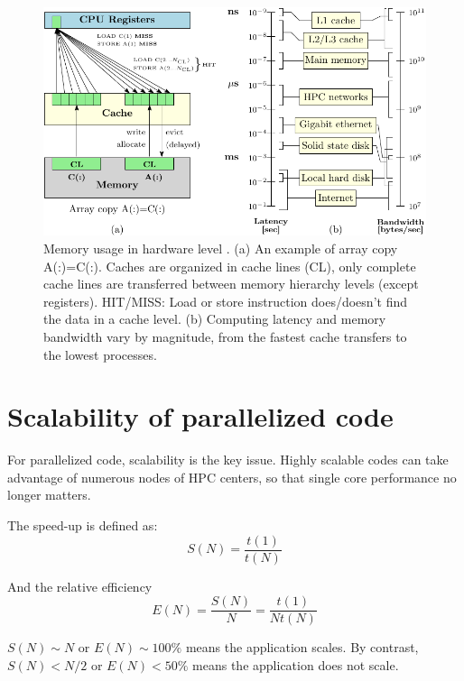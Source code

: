 \begin{figure}[h]
\begin{centering}
\includegraphics{_figure/memory}
\par\end{centering}
\caption[Memory usage in hardware level]{Memory usage in hardware level \citep{LRZ-cours}. (a) An example
of array copy A(:)=C(:). Caches are organized in cache lines (CL),
only complete cache lines are transferred between memory hierarchy
levels (except registers). HIT/MISS: Load or store instruction does/doesn't
find the data in a cache level. (b) Computing latency and memory bandwidth
vary by magnitude, from the fastest cache transfers to the lowest
processes.\label{fig:Memory}}
\end{figure}


\section{Scalability of parallelized code}

For parallelized code, scalability is the key issue. Highly scalable
codes can take advantage of numerous nodes of HPC centers, so that
single core performance no longer matters. 

The speed-up is defined as:
\begin{equation}
S(N)=\dfrac{t(1)}{t(N)}
\end{equation}

And the relative efficiency
\begin{equation}
E(N)=\dfrac{S(N)}{N}=\dfrac{t(1)}{Nt(N)}
\end{equation}

$S(N)\sim N$ or $E(N)\sim100\%$ means the application scales. By
contrast, $S(N)<N/2$ or $E(N)<50\%$ means the application does not
scale. 

